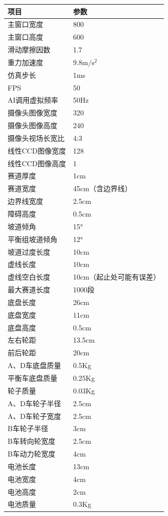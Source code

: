 \documentclass[titlepage,a4paper]{ctexart}
\begin{document}
\begin{center}
\begin{tabular}{ll}
\hline
项目	& 参数 \\
\hline
主窗口宽度	 & 800 \\
主窗口高度	 & 600 \\
滑动摩擦因数	 & 1.7 \\
重力加速度	 & $9.8\mathrm{m/s^2}$ \\
\hline
仿真步长	 & 1ms \\
FPS	 & 50 \\
AI调用虚拟频率	 & 50Hz \\
\hline
摄像头图像宽度	 & 320 \\
摄像头图像高度	 & 240 \\
摄像头视场长宽比    & 4:3 \\
\hline
线性CCD图像宽度	 & 128 \\
线性CCD图像高度	 & 1 \\
\hline
赛道厚度	 & 1cm \\
赛道宽度	 & 45cm（含边界线） \\
边界线宽度	 & 2.5cm \\
障碍高度	 & 0.5cm \\
坡道倾角	 & 15° \\
平衡组坡道倾角 & 12° \\
坡道过度长度	 & 10cm \\
虚线长度	 & 10cm \\
虚线空白长度	 & 10cm（起止处可能有误差） \\
最大赛道长度	 & 1000段 \\
\hline
底盘长度	 & 26cm \\
底盘宽度	 & 11cm \\
底盘高度	 & 0.5cm \\
左右轮距	 & 13.5cm \\
前后轮距	 & 20cm \\
A、D车底盘质量   & 0.5Kg  \\
平衡车底盘质量 & 0.25Kg \\
\hline
轮子质量   & 0.03Kg \\
A、D车轮子半径	 & 2.5cm \\
A、D车轮子宽度	 & 2.5cm \\
B车轮子半径	 & 3cm \\
B车转向轮宽度	 & 2.5cm \\
B车动力轮宽度	 & 4cm \\
\hline
电池长度	 & 13cm \\
电池宽度	 & 4cm \\
电池高度	 & 2cm \\
电池质量	 & 0.3Kg \\
\hline
\end{tabular}
\end{center}
\end{document}
